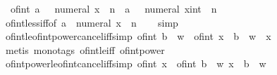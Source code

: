 \begin{isabellebody}
\ \ {\isachardoublequoteopen}of{\isacharunderscore}{\kern0pt}int\ a\ {\isacharless}{\kern0pt}\ {\isacharparenleft}{\kern0pt}{\isacharminus}{\kern0pt}\ numeral\ x{\isacharparenright}{\kern0pt}\ {\isacharcircum}{\kern0pt}\ n\ {\isasymlongleftrightarrow}\ a\ {\isacharless}{\kern0pt}\ {\isacharparenleft}{\kern0pt}{\isacharminus}{\kern0pt}\ numeral\ x{\isacharcolon}{\kern0pt}{\isacharcolon}{\kern0pt}int{\isacharparenright}{\kern0pt}\ {\isacharcircum}{\kern0pt}\ n{\isachardoublequoteclose}\isanewline
%
\isadelimproof
\ \ %
\endisadelimproof
%
\isatagproof
{}\isamarkupfalse%
\ of{\isacharunderscore}{\kern0pt}int{\isacharunderscore}{\kern0pt}less{\isacharunderscore}{\kern0pt}iff{\isacharbrackleft}{\kern0pt}of\ a\ {\isachardoublequoteopen}{\isacharparenleft}{\kern0pt}{\isacharminus}{\kern0pt}\ numeral\ x{\isacharparenright}{\kern0pt}\ {\isacharcircum}{\kern0pt}\ n{\isachardoublequoteclose}{\isacharbrackright}{\kern0pt}\isanewline
\ \ \isamarkupfalse%
\ simp%
\endisatagproof
{\isafoldproof}%
%
\isadelimproof
\isanewline
%
\endisadelimproof
\isanewline
{}\isamarkupfalse%
\ of{\isacharunderscore}{\kern0pt}int{\isacharunderscore}{\kern0pt}le{\isacharunderscore}{\kern0pt}of{\isacharunderscore}{\kern0pt}int{\isacharunderscore}{\kern0pt}power{\isacharunderscore}{\kern0pt}cancel{\isacharunderscore}{\kern0pt}iff{\isacharbrackleft}{\kern0pt}simp{\isacharbrackright}{\kern0pt}{\isacharcolon}{\kern0pt}\ {\isachardoublequoteopen}{\isacharparenleft}{\kern0pt}of{\isacharunderscore}{\kern0pt}int\ b{\isacharparenright}{\kern0pt}\ {\isacharcircum}{\kern0pt}\ w\ {\isasymle}\ of{\isacharunderscore}{\kern0pt}int\ x\ {\isasymlongleftrightarrow}\ b\ {\isacharcircum}{\kern0pt}\ w\ {\isasymle}\ x{\isachardoublequoteclose}\isanewline
%
\isadelimproof
\ \ %
\endisadelimproof
%
\isatagproof
{}\isamarkupfalse%
\ {\isacharparenleft}{\kern0pt}metis\ {\isacharparenleft}{\kern0pt}mono{\isacharunderscore}{\kern0pt}tags{\isacharparenright}{\kern0pt}\ of{\isacharunderscore}{\kern0pt}int{\isacharunderscore}{\kern0pt}le{\isacharunderscore}{\kern0pt}iff\ of{\isacharunderscore}{\kern0pt}int{\isacharunderscore}{\kern0pt}power{\isacharparenright}{\kern0pt}%
\endisatagproof
{\isafoldproof}%
%
\isadelimproof
\isanewline
%
\endisadelimproof
\isanewline
{}\isamarkupfalse%
\ of{\isacharunderscore}{\kern0pt}int{\isacharunderscore}{\kern0pt}power{\isacharunderscore}{\kern0pt}le{\isacharunderscore}{\kern0pt}of{\isacharunderscore}{\kern0pt}int{\isacharunderscore}{\kern0pt}cancel{\isacharunderscore}{\kern0pt}iff{\isacharbrackleft}{\kern0pt}simp{\isacharbrackright}{\kern0pt}{\isacharcolon}{\kern0pt}\ {\isachardoublequoteopen}of{\isacharunderscore}{\kern0pt}int\ x\ {\isasymle}\ {\isacharparenleft}{\kern0pt}of{\isacharunderscore}{\kern0pt}int\ b{\isacharparenright}{\kern0pt}\ {\isacharcircum}{\kern0pt}\ w{\isasymlongleftrightarrow}\ x\ {\isasymle}\ b\ {\isacharcircum}{\kern0pt}\ w{\isachardoublequoteclose}\isanewline

\end{isabellebody}
